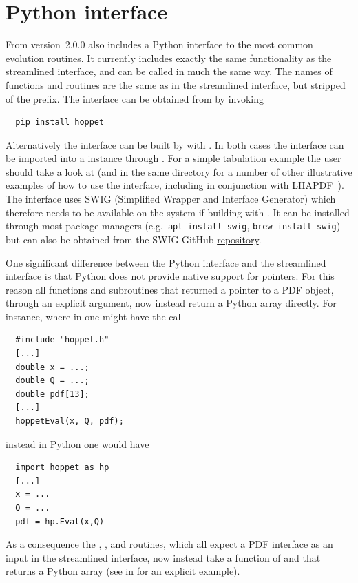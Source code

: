 \section{Python interface}
\label{sec:pyinterface}
From version~2.0.0 \hoppet also includes a Python interface to the
most common evolution routines. It currently includes exactly the same
functionality as the streamlined interface, and can be called in much
the same way. The names of functions and routines are the same as in
the streamlined interface, but stripped of the 
prefix. The interface can be obtained from  by invoking
\begin{lstlisting}
  pip install hoppet
\end{lstlisting}
Alternatively the interface can be built by  with
. In both cases the interface can
be imported into a  instance through . For a simple tabulation example the user should take a look
at
(and in the same directory for a number of other illustrative examples
of how to use the interface, including in conjunction with
LHAPDF~\cite{LHAPDF}). The interface uses SWIG (Simplified Wrapper and
Interface Generator) which therefore needs to be available on the
system if building with . It can be installed through most
package managers (e.g.\ \texttt{apt install swig}, \texttt{brew
  install swig}) but can also be obtained from the SWIG GitHub
\href{https://github.com/swig}{repository}.

One significant difference between the Python interface and the
streamlined interface is that Python does not provide native support
for pointers. For this reason all functions and subroutines that
returned a pointer to a PDF object, through an explicit argument, now
instead return a Python array directly. For instance, where in \CPP{}
one might have the call
%
\begin{lstlisting}
  #include "hoppet.h"
  [...]
  double x = ...;
  double Q = ...;
  double pdf[13];
  [...]
  hoppetEval(x, Q, pdf);
\end{lstlisting}
%
instead in Python one would have
%
\begin{lstlisting}
  import hoppet as hp
  [...]
  x = ...
  Q = ...
  pdf = hp.Eval(x,Q)
\end{lstlisting}
As a consequence the , , and
 routines, which all expect a PDF interface as an input in
the streamlined interface, now instead take a function of  and
 that returns a Python array (see  in
for an explicit example).

